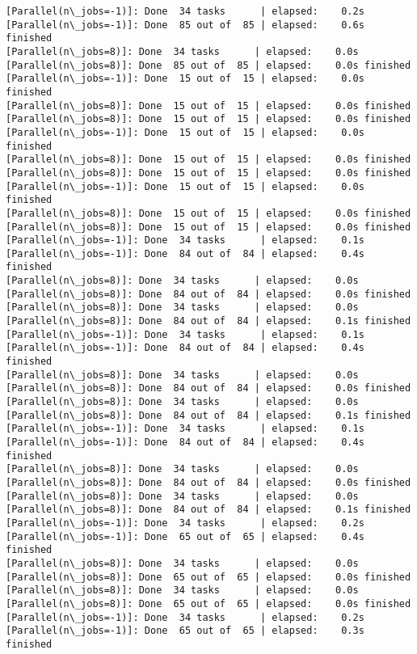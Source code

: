 \documentclass[11pt]{article}
\begin{document}
\begin{Verbatim}[commandchars=\\\{\}]
[Parallel(n\_jobs=-1)]: Done  34 tasks      | elapsed:    0.2s
[Parallel(n\_jobs=-1)]: Done  85 out of  85 | elapsed:    0.6s finished
[Parallel(n\_jobs=8)]: Done  34 tasks      | elapsed:    0.0s
[Parallel(n\_jobs=8)]: Done  85 out of  85 | elapsed:    0.0s finished
[Parallel(n\_jobs=-1)]: Done  15 out of  15 | elapsed:    0.0s finished
[Parallel(n\_jobs=8)]: Done  15 out of  15 | elapsed:    0.0s finished
[Parallel(n\_jobs=8)]: Done  15 out of  15 | elapsed:    0.0s finished
[Parallel(n\_jobs=-1)]: Done  15 out of  15 | elapsed:    0.0s finished
[Parallel(n\_jobs=8)]: Done  15 out of  15 | elapsed:    0.0s finished
[Parallel(n\_jobs=8)]: Done  15 out of  15 | elapsed:    0.0s finished
[Parallel(n\_jobs=-1)]: Done  15 out of  15 | elapsed:    0.0s finished
[Parallel(n\_jobs=8)]: Done  15 out of  15 | elapsed:    0.0s finished
[Parallel(n\_jobs=8)]: Done  15 out of  15 | elapsed:    0.0s finished
[Parallel(n\_jobs=-1)]: Done  34 tasks      | elapsed:    0.1s
[Parallel(n\_jobs=-1)]: Done  84 out of  84 | elapsed:    0.4s finished
[Parallel(n\_jobs=8)]: Done  34 tasks      | elapsed:    0.0s
[Parallel(n\_jobs=8)]: Done  84 out of  84 | elapsed:    0.0s finished
[Parallel(n\_jobs=8)]: Done  34 tasks      | elapsed:    0.0s
[Parallel(n\_jobs=8)]: Done  84 out of  84 | elapsed:    0.1s finished
[Parallel(n\_jobs=-1)]: Done  34 tasks      | elapsed:    0.1s
[Parallel(n\_jobs=-1)]: Done  84 out of  84 | elapsed:    0.4s finished
[Parallel(n\_jobs=8)]: Done  34 tasks      | elapsed:    0.0s
[Parallel(n\_jobs=8)]: Done  84 out of  84 | elapsed:    0.0s finished
[Parallel(n\_jobs=8)]: Done  34 tasks      | elapsed:    0.0s
[Parallel(n\_jobs=8)]: Done  84 out of  84 | elapsed:    0.1s finished
[Parallel(n\_jobs=-1)]: Done  34 tasks      | elapsed:    0.1s
[Parallel(n\_jobs=-1)]: Done  84 out of  84 | elapsed:    0.4s finished
[Parallel(n\_jobs=8)]: Done  34 tasks      | elapsed:    0.0s
[Parallel(n\_jobs=8)]: Done  84 out of  84 | elapsed:    0.0s finished
[Parallel(n\_jobs=8)]: Done  34 tasks      | elapsed:    0.0s
[Parallel(n\_jobs=8)]: Done  84 out of  84 | elapsed:    0.1s finished
[Parallel(n\_jobs=-1)]: Done  34 tasks      | elapsed:    0.2s
[Parallel(n\_jobs=-1)]: Done  65 out of  65 | elapsed:    0.4s finished
[Parallel(n\_jobs=8)]: Done  34 tasks      | elapsed:    0.0s
[Parallel(n\_jobs=8)]: Done  65 out of  65 | elapsed:    0.0s finished
[Parallel(n\_jobs=8)]: Done  34 tasks      | elapsed:    0.0s
[Parallel(n\_jobs=8)]: Done  65 out of  65 | elapsed:    0.0s finished
[Parallel(n\_jobs=-1)]: Done  34 tasks      | elapsed:    0.2s
[Parallel(n\_jobs=-1)]: Done  65 out of  65 | elapsed:    0.3s finished

\end{Verbatim}
\end{document}
